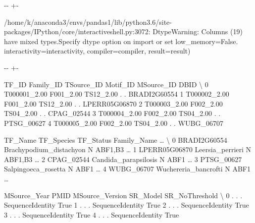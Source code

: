 \documentclass[letterpaper,10pt,english]{sphinxmanual}
\newlength\nbsphinxcodecellspacing
\begin{document}
{

\kern-\sphinxverbatimsmallskipamount\kern-\baselineskip
\kern+\FrameHeightAdjust\kern-\fboxrule
\vspace{\nbsphinxcodecellspacing}

\begin{sphinxVerbatim}[commandchars=\\\{\}]
/home/k/anaconda3/envs/pandas1/lib/python3.6/site-packages/IPython/core/interactiveshell.py:3072: DtypeWarning: Columns (19) have mixed types.Specify dtype option on import or set low\_memory=False.
  interactivity=interactivity, compiler=compiler, result=result)
\end{sphinxVerbatim}
}

{

\kern-\sphinxverbatimsmallskipamount\kern-\baselineskip
\kern+\FrameHeightAdjust\kern-\fboxrule
\vspace{\nbsphinxcodecellspacing}

\begin{sphinxVerbatim}[commandchars=\\\{\}]
\llap{\color{nbsphinxout}[4]:\,\hspace{\fboxrule}\hspace{\fboxsep}}          TF\_ID  Family\_ID TSource\_ID Motif\_ID MSource\_ID           DBID  \textbackslash{}
0  T000001\_2.00  F001\_2.00  TS12\_2.00        .          .   BRADI2G60554
1  T000002\_2.00  F001\_2.00  TS12\_2.00        .          .  LPERR05G06870
2  T000003\_2.00  F002\_2.00  TS04\_2.00        .          .     CPAG\_02544
3  T000004\_2.00  F002\_2.00  TS04\_2.00        .          .     PTSG\_00627
4  T000005\_2.00  F002\_2.00  TS04\_2.00        .          .     WUBG\_06707

         TF\_Name               TF\_Species TF\_Status Family\_Name  {\ldots}  \textbackslash{}
0   BRADI2G60554  Brachypodium\_distachyon         N     ABF1,B3  {\ldots}
1  LPERR05G06870         Leersia\_perrieri         N     ABF1,B3  {\ldots}
2     CPAG\_02544     Candida\_parapsilosis         N        ABF1  {\ldots}
3     PTSG\_00627      Salpingoeca\_rosetta         N        ABF1  {\ldots}
4     WUBG\_06707     Wuchereria\_bancrofti         N        ABF1  {\ldots}

  MSource\_Year  PMID  MSource\_Version          SR\_Model SR\_NoThreshold  \textbackslash{}
0            .     .                .  SequenceIdentity           True
1            .     .                .  SequenceIdentity           True
2            .     .                .  SequenceIdentity           True
3            .     .                .  SequenceIdentity           True
4            .     .                .  SequenceIdentity           True


\end{sphinxVerbatim}}
\end{document}
